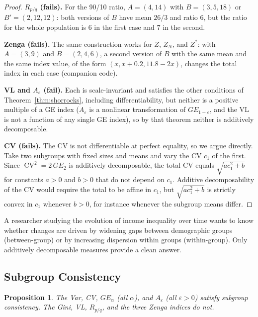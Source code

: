 \documentclass[12pt]{article}
\theoremstyle{plain}
\newtheorem{proposition}[theorem]{Proposition}
\theoremstyle{definition}
\theoremstyle{remark}
\begin{document}
\begin{proof}
\textbf{$R_{p/q}$ (fails).}
For the 90/10 ratio, $A = (4, 14)$ with $B = (3, 5, 18)$ or $B' = (2, 12, 12)$: both versions of $B$ have mean $26/3$ and ratio $6$, but the ratio for the whole population is $6$ in the first case and $7$ in the second.

\textbf{Zenga (fails).}
The same construction works for $Z$, $Z_N$, and $Z^*$: with $A = (3, 9)$ and $B = (2, 4, 6)$, a second version of $B$ with the same mean and the same index value, of the form $(x, x + 0.2, 11.8 - 2x)$, changes the total index in each case (companion code).

\textbf{VL and $A_\varepsilon$ (fail).}
Each is scale-invariant and satisfies the other conditions of Theorem~\ref{thm:shorrocks}, including differentiability, but neither is a positive multiple of a GE index ($A_\varepsilon$ is a nonlinear transformation of $GE_{1-\varepsilon}$, and the VL is not a function of any single GE index), so by that theorem neither is additively decomposable.

\textbf{CV (fails).}
The CV is not differentiable at perfect equality, so we argue directly.
Take two subgroups with fixed sizes and means and vary the CV $c_1$ of the first.
Since $\operatorname{CV}^2 = 2\,GE_2$ is additively decomposable, the total CV equals $\sqrt{a c_1^2 + b}$ for constants $a > 0$ and $b > 0$ that do not depend on $c_1$.
Additive decomposability of the CV would require the total to be affine in $c_1$, but $\sqrt{a c_1^2 + b}$ is strictly convex in $c_1$ whenever $b > 0$, for instance whenever the subgroup means differ.
\end{proof}

A researcher studying the evolution of income inequality over time wants to know whether changes are driven by widening gaps between demographic groups (between-group) or by increasing dispersion within groups (within-group).
Only additively decomposable measures provide a clean answer.

\subsection{Subgroup Consistency}

\begin{proposition}\label{prop:subgroup}
The Var, CV, $GE_\alpha$ (all $\alpha$), and $A_\varepsilon$ (all $\varepsilon > 0$) satisfy subgroup consistency.
The Gini, VL, $R_{p/q}$, and the three Zenga indices do not.
\end{proposition}
\end{document}
